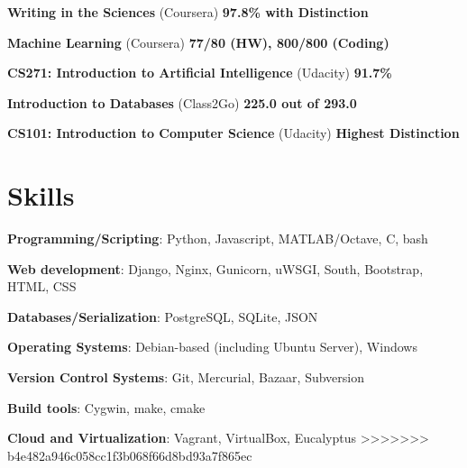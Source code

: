 \documentclass[margin,line]{resume}
\begin{document}
\begin{resume}
    \begin{list2}
	\item \textbf{Writing in the Sciences} (Coursera) \hspace{60mm} \textbf{97.8\% with Distinction}
	\end{list2}
    
    \begin{list2}
	\item \textbf{Machine Learning} (Coursera) \hspace{54mm} \textbf{77/80 (HW), 800/800 (Coding)}
	\end{list2}
    
    \begin{list2}
	\item \textbf{CS271: Introduction to Artificial Intelligence} (Udacity) \hspace{52mm} \textbf{91.7\%}
	\end{list2}
    
    \begin{list2}
	\item \textbf{Introduction to Databases} (Class2Go) \hspace{64mm} \textbf{225.0 out of 293.0}
    \end{list2}

    \begin{list2}
	\item \textbf{CS101: Introduction to Computer Science} (Udacity) \hspace{34mm} \textbf{Highest Distinction}
	\end{list2}

    \section{\mysidestyle Skills} 

    \begin{list2}
	\item \textbf{Programming/Scripting}: \hspace{5mm} Python, Javascript, MATLAB/Octave, C, bash
	\item \textbf{Web development}: \hspace{16mm} Django, Nginx, Gunicorn, uWSGI, South, Bootstrap, HTML, CSS
	\item \textbf{Databases/Serialization}: \hspace{5.7mm} PostgreSQL, SQLite,	JSON
	\item \textbf{Operating Systems}: \hspace{13.8mm} Debian-based (including Ubuntu Server), Windows
	\item \textbf{Version Control Systems}: \hspace{3.8mm} Git, Mercurial, Bazaar, Subversion
	\item \textbf{Build tools}: \hspace{28mm} Cygwin, make, cmake
	\item \textbf{Cloud and Virtualization}: \hspace{3mm} Vagrant, VirtualBox, Eucalyptus
>>>>>>> b4e482a946c058cc1f3b068f66d8bd93a7f865ec
	\end{list2}


\end{resume}
\end{document}
